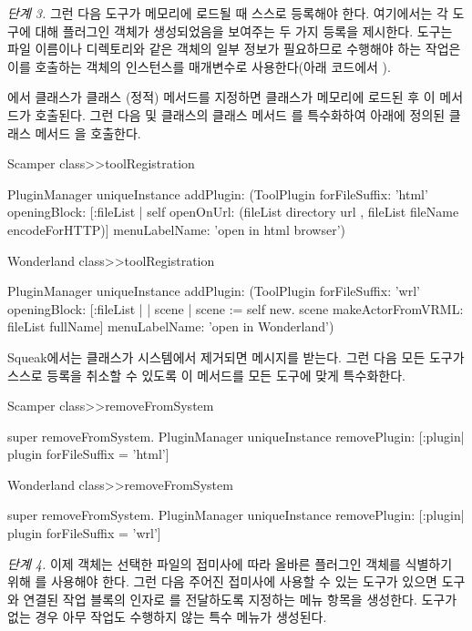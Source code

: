\documentclass[a4paper,10pt,twoside]{book}
\begin{document}
\noindent
\emph{단계 3.}
그런 다음 도구가 메모리에 로드될 때 스스로 등록해야 한다. 여기에서는 각 도구에 대해 플러그인 객체가 생성되었음을 보여주는 두 가지 등록을 제시한다. 도구는 파일 이름이나 디렉토리와 같은  객체의 일부 정보가 필요하므로 수행해야 하는 작업은 이를 호출하는  객체의 인스턴스를 매개변수로 사용한다(아래 코드에서 \lct{[:fileList |...]}).

에서 클래스가 클래스 (정적)  메서드를 지정하면 클래스가 메모리에 로드된 후 이 메서드가 호출된다. 그런 다음  및  클래스의 클래스 메서드 를 특수화하여 아래에 정의된 클래스 메서드 을 호출한다.

\begin{code}
Scamper class>>toolRegistration

	PluginManager uniqueInstance 
		addPlugin: 
		(ToolPlugin 
				forFileSuffix: 'html' 
				openingBlock: 
					[:fileList |
					self openOnUrl: 
						(fileList directory url , 
							fileList fileName encodeForHTTP)]
				menuLabelName: 'open in html browser')	

Wonderland class>>toolRegistration

	PluginManager uniqueInstance 
		addPlugin: 
		(ToolPlugin 
				forFileSuffix: 'wrl' 
				openingBlock: 
					[:fileList | 
					| scene |
					scene := self new.
					scene makeActorFromVRML: fileList fullName]
				menuLabelName: 'open in Wonderland')
\end{code}

Squeak에서는 클래스가 시스템에서 제거되면  메시지를 받는다. 그런 다음 모든 도구가 스스로 등록을 취소할 수 있도록 이 메서드를 모든 도구에 맞게 특수화한다.

\begin{code}
Scamper class>>removeFromSystem
	
	super removeFromSystem.
	PluginManager uniqueInstance 
		removePlugin: [:plugin| plugin forFileSuffix = 'html']

Wonderland class>>removeFromSystem
	
	super removeFromSystem.
	PluginManager uniqueInstance 
		removePlugin: [:plugin| plugin forFileSuffix = 'wrl']
\end{code}

\noindent
\emph{단계 4.}
이제  객체는 선택한 파일의 접미사에 따라 올바른 플러그인 객체를 식별하기 위해 를 사용해야 한다. 그런 다음 주어진 접미사에 사용할 수 있는 도구가 있으면 도구와 연결된 작업 블록의 인자로 를 전달하도록 지정하는 메뉴 항목을 생성한다. 도구가 없는 경우 아무 작업도 수행하지 않는 특수 메뉴가 생성된다.
\end{document}
